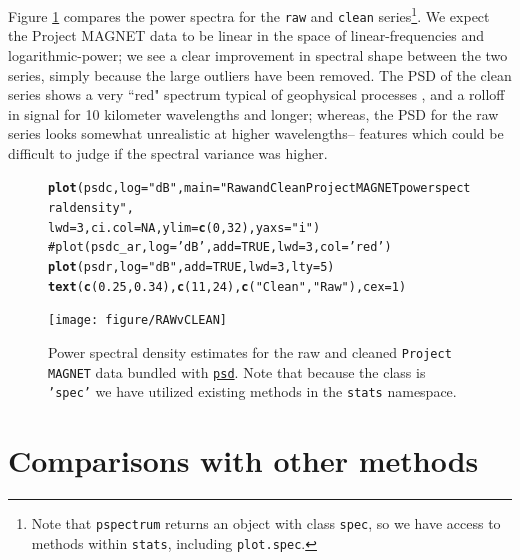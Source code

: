 \documentclass{article}\usepackage{graphicx, color}
\makeatletter
\newcommand{\hlfunctioncall}[1]{\textcolor[rgb]{0.501960784313725,0,0.329411764705882}{\textbf{#1}}}%
\newcommand{\hlstring}[1]{\textcolor[rgb]{0.6,0.6,1}{#1}}%
\newcommand{\hlcomment}[1]{\textcolor[rgb]{0.180392156862745,0.6,0.341176470588235}{#1}}%
\newenvironment{kframe}{%
 \def\at@end@of@kframe{}%
 \ifinner\ifhmode%
  \def\at@end@of@kframe{\end{minipage}}%
  \begin{minipage}{\columnwidth}%
 \fi\fi%
 \def\FrameCommand##1{\hskip\@totalleftmargin \hskip-\fboxsep
 \colorbox{shadecolor}{##1}\hskip-\fboxsep
     \hskip-\linewidth \hskip-\@totalleftmargin \hskip\columnwidth}%
 \MakeFramed {\advance\hsize-\width
   \@totalleftmargin\z@ \linewidth\hsize
   \@setminipage}}%
 {\par\unskip\endMakeFramed%
 \at@end@of@kframe}
\newenvironment{knitrout}{}{} %
\newcommand{\Rcmd}[1]{\texttt{#1}}
\newcommand{\psd}[0]{\href{http://abarbour.github.com/psd/}{\color{blue}\Rcmd{psd}}}
\makeatother
\begin{document}
Figure \ref{fig:pmag} compares the 
power spectra for the \Rcmd{raw} and \Rcmd{clean} 
series\footnote{
Note that \Rcmd{pspectrum} returns
an object with class \Rcmd{spec}, so we have access to methods 
within \Rcmd{stats}, including \Rcmd{plot.spec}.
}.  
We expect the Project MAGNET data to be linear in the space of
linear-frequencies and logarithmic-power;
we see a clear
improvement in spectral shape between the two series,
simply because the large outliers have been removed.
The PSD of the clean series shows a
very ``red" spectrum typical of geophysical processes \citep{agnew1992},
and a rolloff in signal
for 10 kilometer wavelengths and longer; whereas, the 
PSD for the raw series looks somewhat unrealistic at higher wavelengths--
features which could be difficult to judge if the spectral variance was higher.

%
\begin{figure}[htb!]
\begin{center}
\begin{knitrout}
\color{fgcolor}\begin{kframe}
\begin{alltt}
\hlfunctioncall{plot}(psdc, log = \hlstring{"dB"}, main = \hlstring{"Raw and Clean Project MAGNET power spectral density"}, 
    lwd = 3, ci.col = NA, ylim = \hlfunctioncall{c}(0, 32), yaxs = \hlstring{"i"})
\hlcomment{# plot(psdc_ar, log='dB', add=TRUE, lwd=3, col='red')}
\hlfunctioncall{plot}(psdr, log = \hlstring{"dB"}, add = TRUE, lwd = 3, lty = 5)
\hlfunctioncall{text}(\hlfunctioncall{c}(0.25, 0.34), \hlfunctioncall{c}(11, 24), \hlfunctioncall{c}(\hlstring{"Clean"}, \hlstring{"Raw"}), cex = 1)
\end{alltt}
\end{kframe}
\texttt{[image: figure/RAWvCLEAN]} 

\end{knitrout}

\caption{Power spectral density estimates for the raw and cleaned
             \Rcmd{Project MAGNET} data bundled with \psd{}. Note that
             because the class is \Rcmd{'spec'} we have
             utilized  existing methods in the \Rcmd{stats} namespace.}
\label{fig:pmag}
\end{center}
\end{figure}

\section{Comparisons with other methods}
\end{document}
